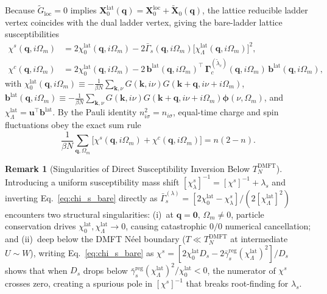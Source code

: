 \documentclass[11pt,a4paper]{article}
\numberwithin{equation}{section}
\theoremstyle{plain}
\theoremstyle{definition}
\newtheorem{remark}{Remark}[section]
\providecommand{\vk}{\mathbf{k}}
\providecommand{\vq}{\mathbf{q}}
\begin{document}
Because $\tilde{G}_{\mathrm{loc}} = 0$ implies
$\mathbf{X}_0^{\mathrm{lat}}(\vq) = \mathbf{X}_0^{\mathrm{loc}} + \tilde{\mathbf{X}}_0(\vq)$,
the lattice reducible ladder vertex coincides with the dual ladder vertex, giving the
bare-ladder lattice susceptibilities
\begin{align}
    \chi^s(\vq,i\Omega_m)
    &= 2\chi_0^{\mathrm{lat}}(\vq,i\Omega_m)
       - 2\bar{\Gamma}_s(\vq,i\Omega_m)\bigl[\chi_\Lambda^{\mathrm{lat}}(\vq,i\Omega_m)\bigr]^2,
    \label{eq:chi_s_bare} \\
    \chi^c(\vq,i\Omega_m)
    &= 2\chi_0^{\mathrm{lat}}(\vq,i\Omega_m)
       - 2\,\mathbf{b}^{\mathrm{lat}}(\vq,i\Omega_m)^\top\,
         \mathbf{\Gamma}_c^{(\tilde{\lambda}_c)}(\vq,i\Omega_m)\,
         \mathbf{b}^{\mathrm{lat}}(\vq,i\Omega_m),
    \label{eq:chi_c_rank2}
\end{align}
with $\chi_0^{\mathrm{lat}}(\vq,i\Omega_m) \equiv -\frac{1}{\beta N}\sum_{\vk,\nu} G(\vk,i\nu)G(\vk+\vq,i\nu+i\Omega_m)$,
$\mathbf{b}^{\mathrm{lat}}(\vq,i\Omega_m) \equiv -\frac{1}{\beta N}\sum_{\vk,\nu} G(\vk,i\nu)G(\vk+\vq,i\nu+i\Omega_m)\boldsymbol{\phi}(\nu,\Omega_m)$,
and $\chi_\Lambda^{\mathrm{lat}} = \mathbf{u}^\top\mathbf{b}^{\mathrm{lat}}$. By the
Pauli identity $n_{i\sigma}^2 = n_{i\sigma}$, equal-time charge and spin fluctuations
obey the exact sum rule
\begin{equation}
    \frac{1}{\beta N}\sum_{\vq,\Omega_m}
        \bigl[\chi^s(\vq,i\Omega_m) + \chi^c(\vq,i\Omega_m)\bigr] = n(2 - n).
    \label{eq:pauli_sumrule}
\end{equation}

\begin{remark}[Singularities of Direct Susceptibility Inversion Below $T_N^{\mathrm{DMFT}}$]
\label{rem:moriya_sing}
Introducing a uniform susceptibility mass shift $[\chi_\lambda^s]^{-1} = [\chi^s]^{-1} + \lambda_s$
and inverting Eq.~\eqref{eq:chi_s_bare} directly as
$\bar{\Gamma}_s^{(\lambda)} = [2\chi_0^{\mathrm{lat}} - \chi_\lambda^s]/(2[\chi_\Lambda^{\mathrm{lat}}]^2)$
encounters two structural singularities: (i)~at $\vq = \mathbf{0}$, $\Omega_m \neq 0$,
particle conservation drives $\chi_0^{\mathrm{lat}}, \chi_\Lambda^{\mathrm{lat}} \to 0$,
causing catastrophic $0/0$ numerical cancellation; and (ii)~deep below the DMFT N\'eel
boundary ($T \ll T_N^{\mathrm{DMFT}}$ at intermediate $U \sim W$), writing
Eq.~\eqref{eq:chi_s_bare} as
$\chi^s = [2\chi_0^{\mathrm{lat}}D_s - 2\bar{\gamma}_s^{\mathrm{reg}}(\chi_\Lambda^{\mathrm{lat}})^2]/D_s$
shows that when $D_s$ drops below
$\bar{\gamma}_s^{\mathrm{reg}}(\chi_\Lambda^{\mathrm{lat}})^2/\chi_0^{\mathrm{lat}} < 0$,
the numerator of $\chi^s$ crosses zero, creating a spurious pole in $[\chi^s]^{-1}$ that
breaks root-finding for $\lambda_s$.
\end{remark}
\end{document}

